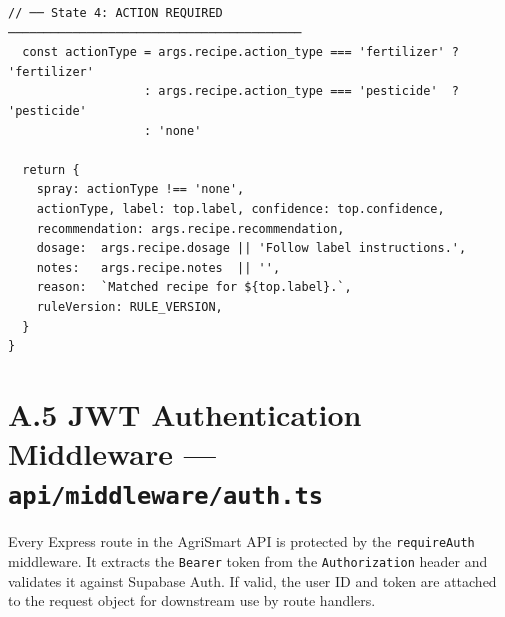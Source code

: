 \documentclass[12pt,a4paper]{report}
\begin{document}
\begin{lstlisting}[style=typescript, caption={Three-state decision logic — Healthy / Action Required / Review (api/lib/decisionEngine.ts)}]
  // ── State 4: ACTION REQUIRED ─────────────────────────────────────────
  const actionType = args.recipe.action_type === 'fertilizer' ? 'fertilizer'
                   : args.recipe.action_type === 'pesticide'  ? 'pesticide'
                   : 'none'

  return {
    spray: actionType !== 'none',
    actionType, label: top.label, confidence: top.confidence,
    recommendation: args.recipe.recommendation,
    dosage:  args.recipe.dosage || 'Follow label instructions.',
    notes:   args.recipe.notes  || '',
    reason:  `Matched recipe for ${top.label}.`,
    ruleVersion: RULE_VERSION,
  }
}
\end{lstlisting}

\newpage

\section*{A.5 \quad JWT Authentication Middleware --- \texttt{api/middleware/auth.ts}}

Every Express route in the AgriSmart API is protected by the \texttt{requireAuth} middleware. It extracts the \texttt{Bearer} token from the \texttt{Authorization} header and validates it against Supabase Auth. If valid, the user ID and token are attached to the request object for downstream use by route handlers.
\end{document}
